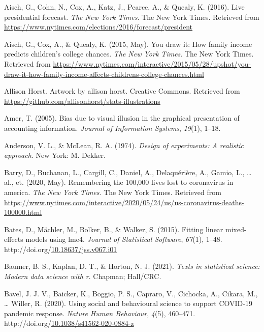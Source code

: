 \documentclass[print]{nuthesis}
\newlength{\cslhangindent}
\newenvironment{CSLReferences}%
{\setlength{\parindent}{0pt}%
\everypar{\setlength{\hangindent}{\cslhangindent}}\ignorespaces}%
{\par}
\begin{document}
\hypertarget{refs}{}
\begin{CSLReferences}{1}{0}
\leavevmode{}%
Aisch, G., Cohn, N., Cox, A., Katz, J., Pearce, A., \& Quealy, K. (2016). Live presidential forecast. \emph{The New York Times}. The New York Times. Retrieved from \url{https://www.nytimes.com/elections/2016/forecast/president}

\leavevmode{}%
Aisch, G., Cox, A., \& Quealy, K. (2015, May). You draw it: How family income predicts children's college chances. \emph{The New York Times}. The New York Times. Retrieved from \url{https://www.nytimes.com/interactive/2015/05/28/upshot/you-draw-it-how-family-income-affects-childrens-college-chances.html}

\leavevmode{}%
Allison Horst. Artwork by allison horst. Creative Commons. Retrieved from \url{https://github.com/allisonhorst/stats-illustrations}

\leavevmode{}%
Amer, T. (2005). Bias due to visual illusion in the graphical presentation of accounting information. \emph{Journal of Information Systems}, \emph{19}(1), 1--18.

\leavevmode{}%
Anderson, V. L., \& McLean, R. A. (1974). \emph{Design of experiments: A realistic approach}. New York: M. Dekker.

\leavevmode{}%
Barry, D., Buchanan, L., Cargill, C., Daniel, A., Delaquérière, A., Gamio, L., \ldots{} al., et. (2020, May). Remembering the 100,000 lives lost to coronavirus in america. \emph{The New York Times}. The New York Times. Retrieved from \url{https://www.nytimes.com/interactive/2020/05/24/us/us-coronavirus-deaths-100000.html}

\leavevmode{}%
Bates, D., Mächler, M., Bolker, B., \& Walker, S. (2015). Fitting linear mixed-effects models using {lme4}. \emph{Journal of Statistical Software}, \emph{67}(1), 1--48. http://doi.org/\href{https://doi.org/10.18637/jss.v067.i01}{10.18637/jss.v067.i01}

\leavevmode{}%
Baumer, B. S., Kaplan, D. T., \& Horton, N. J. (2021). \emph{Texts in statistical science: Modern data science with r}. Chapman; Hall/CRC.

\leavevmode{}%
Bavel, J. J. V., Baicker, K., Boggio, P. S., Capraro, V., Cichocka, A., Cikara, M., \ldots{} Willer, R. (2020). Using social and behavioural science to support {COVID}-19 pandemic response. \emph{Nature Human Behaviour}, \emph{4}(5), 460--471. http://doi.org/\href{https://doi.org/10.1038/s41562-020-0884-z}{10.1038/s41562-020-0884-z}


\end{CSLReferences}
\end{document}
